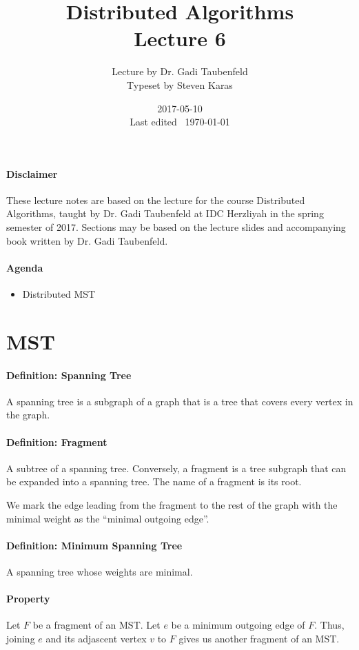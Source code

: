 \documentclass{idc_msc}
\title{Distributed Algorithms\\\large Lecture 6}
\date{2017-05-10 \\ Last edited \currenttime\ \today}
\author{Lecture by Dr. Gadi Taubenfeld\\Typeset by Steven Karas}
\begin{document}
\maketitle

\paragraph{Disclaimer}

These lecture notes are based on the lecture for the course Distributed Algorithms, taught by Dr. Gadi Taubenfeld at IDC Herzliyah in the spring semester of 2017.
Sections may be based on the lecture slides and accompanying book written by Dr. Gadi Taubenfeld.

\paragraph{Agenda}

\begin{itemize}
  \item Distributed MST
\end{itemize}

\section{MST}

\paragraph{Definition: Spanning Tree}
A spanning tree is a subgraph of a graph that is a tree that covers every vertex in the graph.

\paragraph{Definition: Fragment}
A subtree of a spanning tree.
Conversely, a fragment is a tree subgraph that can be expanded into a spanning tree.
The name of a fragment is its root.

We mark the edge leading from the fragment to the rest of the graph with the minimal weight as the ``minimal outgoing edge''.

\paragraph{Definition: Minimum Spanning Tree}
A spanning tree whose weights are minimal.

\paragraph{Property}
Let $F$ be a fragment of an MST. Let $e$ be a minimum outgoing edge of $F$.
Thus, joining $e$ and its adjascent vertex $v$ to $F$ gives us another fragment of an MST.
\end{document}
